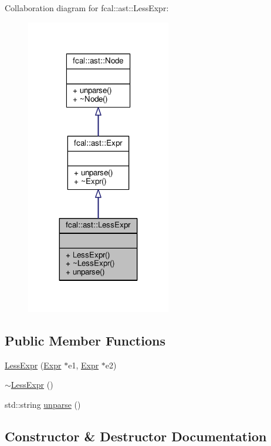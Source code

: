 Collaboration diagram for fcal\+:\+:ast\+:\+:Less\+Expr\+:
\nopagebreak
\begin{figure}[H]
\begin{center}
\leavevmode
\includegraphics[width=179pt]{classfcal_1_1ast_1_1LessExpr__coll__graph}
\end{center}
\end{figure}
\subsection*{Public Member Functions}
\begin{DoxyCompactItemize}
\item 
\hyperlink{classfcal_1_1ast_1_1LessExpr_a01e38dff197780fd0ae1ee75afcd89dc}{Less\+Expr} (\hyperlink{classfcal_1_1ast_1_1Expr}{Expr} $\ast$e1, \hyperlink{classfcal_1_1ast_1_1Expr}{Expr} $\ast$e2)
\item 
\hyperlink{classfcal_1_1ast_1_1LessExpr_af5f22e3a2e2ebe7bb9c22638ce001583}{$\sim$\+Less\+Expr} ()
\item 
std\+::string \hyperlink{classfcal_1_1ast_1_1LessExpr_af3a7eb1f384374183b28ca01224827e2}{unparse} ()
\end{DoxyCompactItemize}


\subsection{Constructor \& Destructor Documentation}

